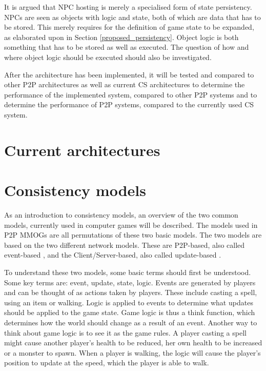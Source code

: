 \documentclass[journal,oneside,a4paper,onecolumn]{IEEEtran}
\begin{document}
It is argued that NPC hosting is merely a specialised form of state persistency. NPCs are seen as objects with logic and state, both of which are data that has to be stored. This merely requires for the definition of game state to be expanded, as elaborated upon in Section \ref{proposed_persistency}. Object logic is both something that has to be stored as well as executed. The question of how and where object logic should be executed should also be investigated.

After the architecture has been implemented, it will be tested and compared to other P2P architectures as well as current \ac{CS} architectures to determine the performance of the implemented system, compared to other P2P systems and to determine the performance of P2P systems, compared to the currently used \ac{CS} system.

\section{Current architectures}
\label{current_architectures}


\section{Consistency models}
\label{consistency_models}

As an introduction to consistency models, an overview of the two common models, currently used in computer games will be described. The models used in P2P MMOGs are all permutations of these two basic models. The two models are based on the two different network models. These are P2P-based, also called event-based \cite{}, and the Client/Server-based, also called update-based \cite{}.

To understand these two models, some basic terms should first be understood. Some key terms are: event, update, state, logic. Events are generated by players and can be thought of as actions taken by players. These include casting a spell, using an item or walking. Logic is applied to events to determine what updates should be applied to the game state. Game logic is thus a think function, which determines how the world should change as a result of an event. Another way to think about game logic is to see it as the game rules. A player casting a spell might cause another player's health to be reduced, her own health to be increased or a monster to spawn. When a player is walking, the logic will cause the player's position to update at the speed, which the player is able to walk.
\end{document}
